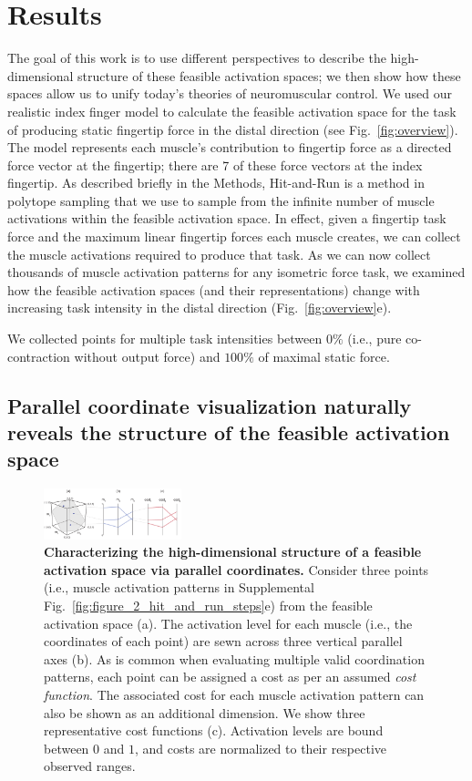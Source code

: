 \documentclass[9pt,twocolumn,twoside,lineno]{pnas-new}
\begin{document}
\section*{Results}

The goal of this work is to use different perspectives to describe the high-dimensional structure of these feasible activation spaces; we then show how these spaces allow us to unify today’s theories of neuromuscular control. We used our realistic index finger model to calculate the feasible activation space for the task of producing static fingertip force in the distal direction (see Fig.~\ref{fig:overview}). The model represents each muscle's contribution to fingertip force as a directed force vector at the fingertip; there are 7 of these force vectors at the index fingertip.
As described briefly in the Methods, Hit-and-Run is a method in polytope sampling that we use to sample from the infinite number of muscle activations within the feasible activation space. In effect, given a fingertip task force and the maximum linear fingertip forces each muscle creates, we can collect the muscle activations required to produce that task. As we can now collect thousands of muscle activation patterns for any isometric force task, we examined how the feasible activation spaces (and their representations) change with increasing task intensity in the distal direction (Fig.~\ref{fig:overview}e).

We collected points for multiple task intensities between $0\%$ (i.e., pure co-contraction without output force) and $100\%$ of maximal static force.


\subsection*{Parallel coordinate visualization naturally reveals the structure of the feasible activation space}


\begin{figure}[htbp]
 \centering
 \includegraphics[width=4cm]{numbered_figures/figure_3_parcoord_schematic.pdf}
 \caption{\textbf{Characterizing the high-dimensional structure of a feasible activation space via parallel coordinates.} Consider three points (i.e., muscle activation patterns in Supplemental Fig.~\ref{fig:figure_2_hit_and_run_steps}e) from the feasible activation space (a). The activation level for each muscle (i.e., the coordinates of each point) are sewn across three vertical parallel axes (b). As is common when evaluating multiple valid coordination patterns, each point can be assigned a cost as per an assumed \emph{cost function}. The associated cost for each muscle activation pattern can also be shown as an additional dimension. We show three representative cost functions (c). Activation levels are bound between $0$ and $1$, and costs are normalized to their respective observed ranges.}
 \label{fig:points_to_parcoords_mapping}
\end{figure}
\end{document}
